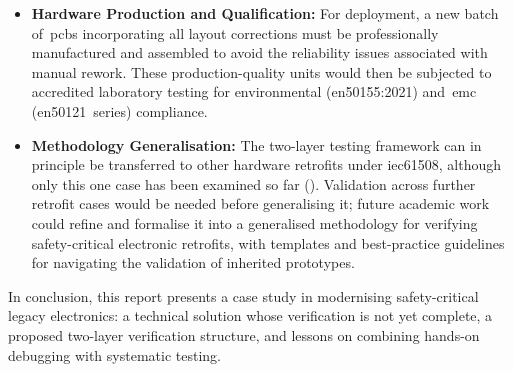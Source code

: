\begin{itemize}
	\item \textbf{Hardware Production and Qualification:} For deployment, a new batch of~\glspl{pcb} incorporating all layout corrections must be professionally manufactured and assembled to avoid the reliability issues associated with manual rework. These production-quality units would then be subjected to accredited laboratory testing for environmental (\gls{en50155}:2021) and~\gls{emc} (\gls{en50121}~series) compliance.
	\item \textbf{Methodology Generalisation:} The two-layer testing framework can in principle be transferred to other hardware retrofits under \gls{iec61508}, although only this one case has been examined so far (). Validation across further retrofit cases would be needed before generalising it; future academic work could refine and formalise it into a generalised methodology for verifying safety-critical electronic retrofits, with templates and best-practice guidelines for navigating the validation of inherited prototypes.
\end{itemize}

In conclusion, this report presents a case study in modernising safety-critical legacy electronics: a technical solution whose verification is not yet complete, a proposed two-layer verification structure, and lessons on combining hands-on debugging with systematic testing.
